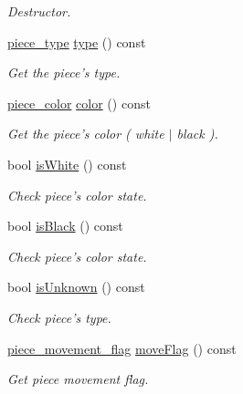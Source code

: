 \begin{DoxyCompactItemize}
\begin{DoxyCompactList}\small\item\em Destructor. \item\end{DoxyCompactList}\item 
\hyperlink{namespaceChEngn_a2a35c185f259757a78e937575b8ed483}{piece\_\-type} \hyperlink{classChEngn_1_1Piece_ada7e6cf6a90f169f2ea1a5d7cefd0900}{type} () const 
\begin{DoxyCompactList}\small\item\em Get the piece's type. \item\end{DoxyCompactList}\item 
\hyperlink{namespaceChEngn_a9c81426c0134a97288a226c122daf62f}{piece\_\-color} \hyperlink{classChEngn_1_1Piece_a9070b15958ab83d1a093456fa8d1e4fd}{color} () const 
\begin{DoxyCompactList}\small\item\em Get the piece's color ( white $|$ black ). \item\end{DoxyCompactList}\item 
bool \hyperlink{classChEngn_1_1Piece_a98920893afeab5395dba002ab3f88703}{isWhite} () const 
\begin{DoxyCompactList}\small\item\em Check piece's color state. \item\end{DoxyCompactList}\item 
bool \hyperlink{classChEngn_1_1Piece_a481b3d61628762f87d674fad3f858c3b}{isBlack} () const 
\begin{DoxyCompactList}\small\item\em Check piece's color state. \item\end{DoxyCompactList}\item 
bool \hyperlink{classChEngn_1_1Piece_a4105456968fa768a8d3673ce3c14eca3}{isUnknown} () const 
\begin{DoxyCompactList}\small\item\em Check piece's type. \item\end{DoxyCompactList}\item 
\hyperlink{namespaceChEngn_a491b2eba2f766087f4f28948005ab16a}{piece\_\-movement\_\-flag} \hyperlink{classChEngn_1_1Piece_a534f3e26cfbff6dde35a4dea75f115b9}{moveFlag} () const 
\begin{DoxyCompactList}\small\item\em Get piece movement flag. \item\end{DoxyCompactList}\item 

\end{DoxyCompactItemize}
